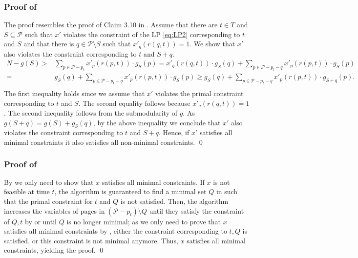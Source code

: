 \documentclass[11pt]{article}
\newcommand{\cP}{{\mathcal{P}}}
\begin{document}
\subsubsection*{Proof of }
	The proof resembles the proof of Claim 3.10 in \cite{coester2022competitive}. Assume that there are $t \in T$ and $S \subseteq \cP$ such that $x'$ violates the constraint of the LP \eqref{eq:LP2} corresponding to $t$ and  $S$ and that there is $q \in \cP \setminus S$ such that $x'_q(r(q,t)) = 1$. We show that $x'$ also violates the constraint corresponding to $t$ and $S+q$.  %
	\begin{equation*}
		\label{eq:PQPQPQ}
		\begin{aligned}
	 N-g(S) >{} & \sum_{p \in \cP-p_t} x'_p(r(p,t)) \cdot g_S(p)
	 = x'_q(r(q,t)) \cdot g_S(q)+\sum_{p \in \cP-p_t-q} x'_p(r(p,t)) \cdot g_S(p)\\
	 ={} & g_S(q)+\sum_{p \in \cP-p_t-q} x'_p(r(p,t)) \cdot g_S(p)
	  \geq g_S(q)+\sum_{p \in \cP-p_t-q} x'_p(r(p,t)) \cdot g_{S+q}(p).\\
		\end{aligned}
	\end{equation*} The first inequality holds since we assume that $x'$ violates the primal constraint corresponding to $t$ and $S$. The second equality follows because $x'_q(r(q,t)) = 1$. The second inequality follows from the submodularity of $g$. As $g(S+q) = g(S)+g_{S}(q)$, by the above inequality we conclude that $x'$ also violates the constraint corresponding to $t$ and $S+q$. Hence, if $x'$ satisfies all minimal constraints it also satisfies all non-minimal constraints. \qed



\subsubsection*{Proof of }
 By  we only need to show that $x$ satisfies all minimal constraints. %
If $x$ is not feasible at time $t$, the algorithm is guaranteed to find a minimal set $Q$ in  such that the primal constraint for $t$ and $Q$ is not satisfied. Then, the algorithm increases the variables of pages in $(\cP-p_t) \setminus Q$ until they satisfy the constraint of $Q,t$ by   or until $Q$ is no longer minimal; as we only need to prove that $x$ satisfies all minimal constraints by , either the constraint corresponding to $t,Q$ is satisfied, or this constraint is not minimal anymore. %
Thus, $x$ satisfies all minimal constraints, yielding the proof. \qed
\end{document}
